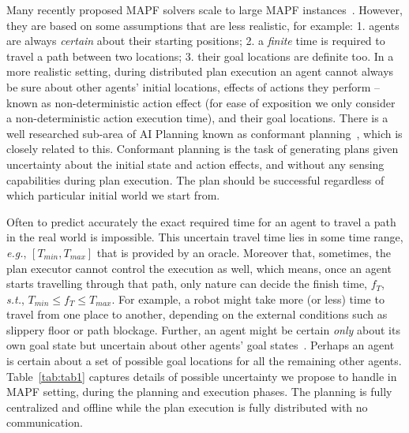 \documentclass{article}
\begin{document}
Many recently proposed MAPF solvers scale to large MAPF instances~\cite{SharonSFS12,FelnerLB00KK18}. However, they are based on some assumptions that are less realistic, for example: 1. agents are always \emph{certain} about their starting positions; 2. a \emph{finite} time is required to travel a path between two locations; 3. their goal locations are definite too. 
In a more realistic setting, during distributed plan execution an agent cannot always be sure about other agents' initial locations, effects of actions they perform -- known as non-deterministic action effect (for ease of exposition we only consider a non-deterministic action execution time), and their goal locations.  
There is a well researched sub-area of AI Planning known as conformant planning~\cite{HoffmannB06,PalaciosG09}, which is closely related to this.
Conformant planning is the task of generating plans given uncertainty about the initial state and action effects, and without any sensing capabilities during plan execution. The plan should be  successful regardless of which particular initial world we start from.

Often to predict accurately the exact required time for an agent to travel a path in the real world is impossible. This uncertain travel time lies in some time range, \emph{e.g.}, $[T_{min}, T_{max}]$ that is provided by an oracle.  
Moreover that, sometimes, the plan executor cannot control the execution as well, which means, once an agent starts travelling through that path, only nature can decide the finish time, $f_T$, \emph{s.t.}, $T_{min} \leq f_T \leq T_{max}$.
%
For example, a robot might take more (or less) time to travel from one place to another,  depending on the external conditions such as slippery floor or path blockage. 
Further, an agent might be certain \emph{only} about its own goal state but uncertain about other agents' goal states~\cite{BolanderEMN18}.
Perhaps an agent is certain about a set of possible goal locations for all the remaining other agents. 
Table~\ref{tab:tab1} captures details of possible uncertainty  we propose to handle in MAPF setting, during the planning and execution phases. 
The planning is fully centralized and offline while the plan execution is fully distributed with no communication.
\end{document}
